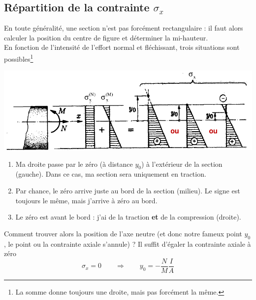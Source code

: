 	\subsection{Répartition de la contrainte $\sigma_x$}
	En toute généralité, une section n'est pas forcément rectangulaire : il faut 
	alors calculer la position du centre de figure et déterminer la mi-hauteur.\\
	En fonction de l'intensité de l'effort normal et fléchissant, trois situations 
	sont possibles\footnote{La somme donne toujours une droite, mais pas forcément 
	la même.}
	\begin{center}
	\includegraphics[scale=0.4]{ch7/image2.png}
	\end{center}
	\begin{enumerate}
	\item Ma droite passe par le zéro (à distance $y_0$) à l'extérieur de la 
	section (gauche). Dans ce cas, ma section sera uniquement en traction.
	\item Par chance, le zéro arrive juste au bord de la section (milieu). Le signe 
	est toujours le même, mais j'arrive à zéro au bord.
	\item Le zéro est avant le bord : j'ai de la traction \textbf{et} de la 
	compression (droite).
	\end{enumerate}
	Comment trouver alors la position de l'axe neutre (et donc notre fameux 
	point $y_0$, le point ou la contrainte axiale s'annule) ? Il suffit d'égaler 
	la contrainte axiale à zéro 
	\begin{equation}
	\sigma_x = 0\qquad\Longrightarrow\qquad y_0=-\dfrac{N}{M}\dfrac{I}{A}
	\end{equation}
	
	
